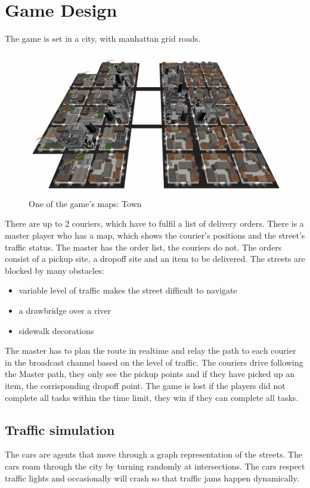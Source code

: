 \documentclass[12pt]{article}
\begin{document}
\section{Game Design}
The game is set in a city, with manhattan grid roads.
\begin{figure}[H]
\includegraphics[width=\textwidth]{map_town}
\caption{One of the game's maps: Town}
\end{figure}
There are up to 2 couriers, which have to fulfil a list of delivery orders.
There is a master player who has a map, which shows the courier's positions and the street's traffic status. The master has the order list, the couriers do not.
The orders consist of a pickup site, a dropoff site and an item to be delivered.
The streets are blocked by many obstacles:
\begin{itemize}
  \item variable level of traffic makes the street difficult to navigate
  \item a drawbridge over a river
  \item sidewalk decorations
\end{itemize}
The master has to plan the route in realtime and relay the path to each courier in the broadcast channel based on the level of traffic.
The couriers drive following the Master path, they only see the pickup points and if they have picked up an item, the corrisponding dropoff point.
The game is lost if the players did not complete all tasks within the time limit, they win if they can complete all tasks.

\subsection{Traffic simulation}
The cars are agents that move through a graph representation of the streets. The cars roam through the city by turning randomly at intersections. The cars respect traffic lights and occasionally will crash so that traffic jams happen dynamically.
\end{document}

